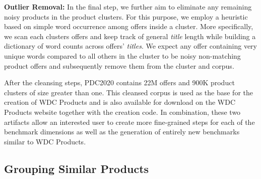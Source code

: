 \documentclass[sigconf,edbt]{acmart-edbt2024}
\begin{document}
\textbf{Outlier Removal:} In the final step, we further aim to eliminate any remaining noisy products in the product clusters. For this purpose, we employ a heuristic based on simple word occurrence among offers inside a cluster. More specifically, we scan each clusters offers and keep track of general \textit{title} length while building a dictionary of word counts across offers' \textit{titles}. We expect any offer containing very unique words compared to all others in the cluster to be noisy non-matching product offers and subsequently remove them from the cluster and corpus.

After the cleansing steps, PDC2020 contains 22M offers and 900K product clusters of size greater than one. This cleansed corpus is used as the base for the creation of WDC Products and is also available for download on the WDC Products website together with the creation code. In combination, these two artifacts allow an interested user to create more fine-grained steps for each of the benchmark dimensions as well as the generation of entirely new benchmarks similar to WDC Products.

\subsection{Grouping Similar Products}
\label{subsec:clustering}
\end{document}
